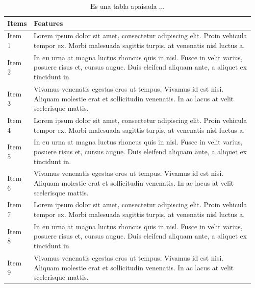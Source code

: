 \documentclass[12pt,a4paper,oneside,]{book}
\numberwithin{dummy}{section}
\theoremstyle{ocrenumbox}
\theoremstyle{blacknumex}
\theoremstyle{blacknumbox}
\theoremstyle{ocrenum}
\theoremstyle{ocrenum}
\begin{document}
\begingroup
\begin{table}
\centering
\caption{Es una tabla apaisada ...} \label{tab:sidewaystable}

\begin{tabular}{>{\raggedright\arraybackslash}p{2cm}>{\raggedright\arraybackslash}p{14cm}}
\toprule
Items & Features\\
\midrule
Item 1 & Lorem ipsum dolor sit amet, consectetur adipiscing elit.
    Proin vehicula tempor ex. Morbi malesuada sagittis turpis,
    at venenatis nisl luctus \vphantom{2} a.\\
Item 2 & In eu urna at magna luctus rhoncus quis in nisl. Fusce in velit
    varius, posuere risus et, cursus augue. Duis eleifend aliquam ante,
    a aliquet ex tincidunt \vphantom{2} in.\\
Item 3 & Vivamus venenatis egestas eros ut tempus. Vivamus id est nisi.
    Aliquam molestie erat et sollicitudin venenatis. In ac lacus at
    velit scelerisque \vphantom{2} mattis.\\
Item 4 & Lorem ipsum dolor sit amet, consectetur adipiscing elit.
    Proin vehicula tempor ex. Morbi malesuada sagittis turpis,
    at venenatis nisl luctus \vphantom{1} a.\\
Item 5 & In eu urna at magna luctus rhoncus quis in nisl. Fusce in velit
    varius, posuere risus et, cursus augue. Duis eleifend aliquam ante,
    a aliquet ex tincidunt \vphantom{1} in.\\
\addlinespace
Item 6 & Vivamus venenatis egestas eros ut tempus. Vivamus id est nisi.
    Aliquam molestie erat et sollicitudin venenatis. In ac lacus at
    velit scelerisque \vphantom{1} mattis.\\
Item 7 & Lorem ipsum dolor sit amet, consectetur adipiscing elit.
    Proin vehicula tempor ex. Morbi malesuada sagittis turpis,
    at venenatis nisl luctus a.\\
Item 8 & In eu urna at magna luctus rhoncus quis in nisl. Fusce in velit
    varius, posuere risus et, cursus augue. Duis eleifend aliquam ante,
    a aliquet ex tincidunt in.\\
Item 9 & Vivamus venenatis egestas eros ut tempus. Vivamus id est nisi.
    Aliquam molestie erat et sollicitudin venenatis. In ac lacus at
    velit scelerisque mattis.\\
\bottomrule
\end{tabular}
\end{table}
\endgroup

\clearpage
\end{document}
